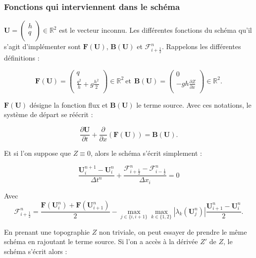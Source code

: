 \documentclass[
11pt, %
francais, %
singlespacing, %
headsepline, %
]{MastersDoctoralThesis} %
\theoremstyle{definition}
\begin{document}
    \hypertarget{fonctions-qui-interviennent-dans-le-schuxe9ma}{%
\subsubsection*{Fonctions qui interviennent dans le
schéma}\label{fonctions-qui-interviennent-dans-le-schuxe9ma}}

\(\textbf{U}= \begin{pmatrix}  h \\  q \\ \end{pmatrix} \in\mathbb{R}^{2}\)
est le vecteur inconnu. Les différentes fonctions du schéma qu'il s'agit
d'implémenter sont \(\textbf{F}(\textbf{U})\),
\(\textbf{B}(\textbf{U})\) et \(\mathcal{F}_{i+\frac{1}{2}}^n\).
Rappelons les différentes définitions :

\[
\textbf{F} (\textbf{U}) =
\begin{pmatrix}
   q                                \\
   \frac{q^{2}}{h}+g\frac{h^{2}}{2} \\
\end{pmatrix}\in\mathbb{R}^{2} ~
\text{et} ~~ \textbf{B} (\textbf{U}) =
\begin{pmatrix}
   0                                \\
   -gh \frac{\partial Z}{\partial x}\\
\end{pmatrix}
\in\mathbb{R}^{2}.
\]

\(\textbf{F} (\textbf{U})\) désigne la fonction flux et
\(\textbf{B} (\textbf{U})\) le terme source. Avec ces notations, le
système de départ se réécrit :

\[\frac{\partial\textbf{U}}{\partial t}+\frac{\partial}{\partial x}(\textbf{F} (\textbf{U})) = \textbf{B} (\textbf{U}).\]

Et si l'on suppose que \(Z\equiv 0\), alors le schéma s'écrit simplement
:

\[\frac{\textbf{U}_i^{n+1}-\textbf{U}_i^{n}}{\Delta t^n}+\frac{\mathcal{F}_{i+\frac{1}{2}}^n - \mathcal{F}_{i-\frac{1}{2}}^n}{\Delta x_i}=0\]

Avec
\[\mathcal{F}_{i+\frac{1}{2}}^n=\frac{\textbf{F}(\textbf{U}_i^{n})+\textbf{F}(\textbf{U}_{i+1}^{n})}{2}-\max_{j\in\{i,i+1\}}\max_{k\in\{1,2\}}|\lambda_k(\textbf{U}_j^n)|\frac{\textbf{U}_{i+1}^n-\textbf{U}_i^n}{2}.\]

En prenant une topographie \(Z\) non triviale, on peut essayer de
prendre le même schéma en rajoutant le terme source. Si l'on a accès à
la dérivée \(Z'\) de \(Z\), le schéma s'écrit alors :
\end{document}
